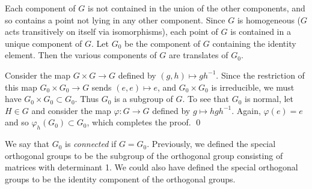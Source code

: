 \documentclass[12pt]{amsart}
\begin{document}
Each component of $G$ is not contained in the union of the other components,
and so contains a point not lying in any other component.
Since $G$ is homogeneous
($G$ acts transitively on itself via isomorphisms),
each point of $G$ is contained in a unique component of $G$.
Let $G_0$ be the component of $G$ containing the identity element.
Then the various components of $G$ are translates of $G_0$.

Consider the map $G\times G\to G$ defined by $(g,h)\mapsto gh^{-1}$.
Since the restriction of this map $G_0\times G_0\to G$ sends 
$(e,e)\mapsto e$, and $G_0\times G_0$ is irreducible, we must have
$G_0\times G_0 \subset G_0$. 
Thus $G_0$ is a subgroup of $G$.
To see that $G_0$ is normal, let $H\in G$ and consider the map
$\varphi\colon G\to G$ defined by $g\mapsto hgh^{-1}$.
Again, $\varphi(e)=e$ and so $\varphi_h(G_0)\subset G_0$, which completes
the proof.
\qed\medskip


We say that $G_0$ is {\sl connected} if $G=G_0$.
Previously, we defined the special orthogonal groups to be the subgroup of
the orthogonal group consisting of matrices with determinant 1.
We could also have defined the special orthogonal groups to be the identity
component of the orthogonal groups.
\end{document}
